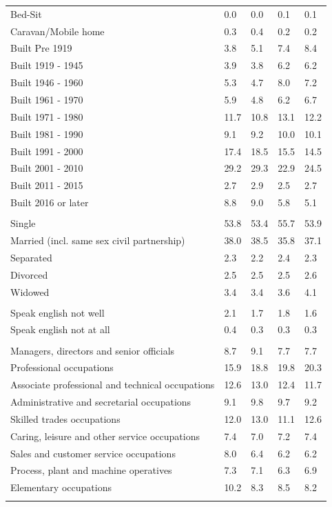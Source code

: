 \documentclass{article}
\begin{document}
\begin{table}[h]
\begin{tabular}{KTTTT}
Bed-Sit & 0.0& 0.0& 0.1& 0.1\\
Caravan/Mobile home & 0.3& 0.4& 0.2& 0.2\\
    \hline
Built Pre 1919 & 3.8& 5.1& 7.4& 8.4\\
Built 1919 - 1945 & 3.9& 3.8& 6.2& 6.2\\
Built  1946 - 1960 & 5.3& 4.7& 8.0& 7.2\\
Built  1961 - 1970 & 5.9& 4.8& 6.2& 6.7\\
Built  1971 - 1980 & 11.7& 10.8& 13.1& 12.2\\
Built  1981 - 1990 &  9.1&  9.2& 10.0& 10.1\\
Built  1991 - 2000 & 17.4& 18.5& 15.5& 14.5\\
Built  2001 - 2010 & 29.2& 29.3& 22.9& 24.5\\
Built  2011 - 2015 & 2.7& 2.9& 2.5& 2.7\\
Built  2016 or later & 8.8& 9.0& 5.8& 5.1\\
\hline
    \\
    \hline
Single & 53.8& 53.4& 55.7& 53.9\\
Married (incl. same sex civil partnership) & 38.0& 38.5& 35.8& 37.1\\
Separated  & 2.3& 2.2& 2.4& 2.3\\
Divorced  & 2.5& 2.5& 2.5& 2.6\\
Widowed & 3.4& 3.4& 3.6& 4.1\\
\hline
    \\ 
    \hline
Speak english not well & 2.1& 1.7& 1.8& 1.6\\
Speak english not at all & 0.4& 0.3& 0.3& 0.3\\
\hline
    \\
    \hline
Managers, directors and senior officials & 8.7& 9.1& 7.7& 7.7\\
Professional occupations & 15.9& 18.8& 19.8& 20.3\\
Associate professional and technical occupations & 12.6& 13.0& 12.4& 11.7\\
Administrative and secretarial occupations & 9.1& 9.8& 9.7& 9.2\\
Skilled trades occupations & 12.0& 13.0& 11.1& 12.6\\
Caring, leisure and other service occupations & 7.4& 7.0& 7.2& 7.4\\
Sales and customer service occupations & 8.0& 6.4& 6.2& 6.2\\
Process, plant and machine operatives & 7.3& 7.1& 6.3& 6.9\\
Elementary occupations & 10.2&  8.3&  8.5&  8.2\\
\hline
\end{tabular}
\end{table}
\end{document}
